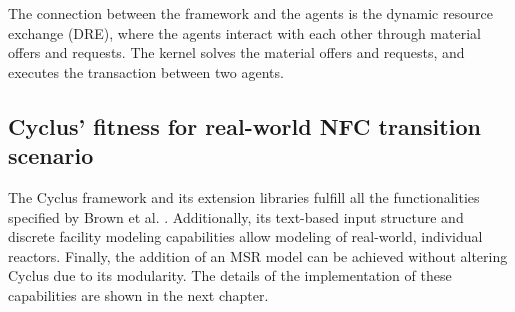 The connection between the framework and the agents is
the dynamic resource exchange (DRE), where the agents
interact with each other through material offers and requests.
The kernel solves the material offers and requests, and executes
the transaction between two agents.

\subsection{Cyclus' fitness for real-world \gls{NFC} transition scenario}
The Cyclus framework and its extension libraries fulfill all the functionalities
specified by Brown et al. \cite{brown_identification_2016}.  Additionally,
its text-based input structure and discrete facility modeling capabilities
allow modeling of real-world, individual reactors. Finally, 
the addition of an \gls{MSR} model can be achieved without altering
Cyclus due to its modularity. The details of the implementation
of these capabilities are shown in the next chapter.


